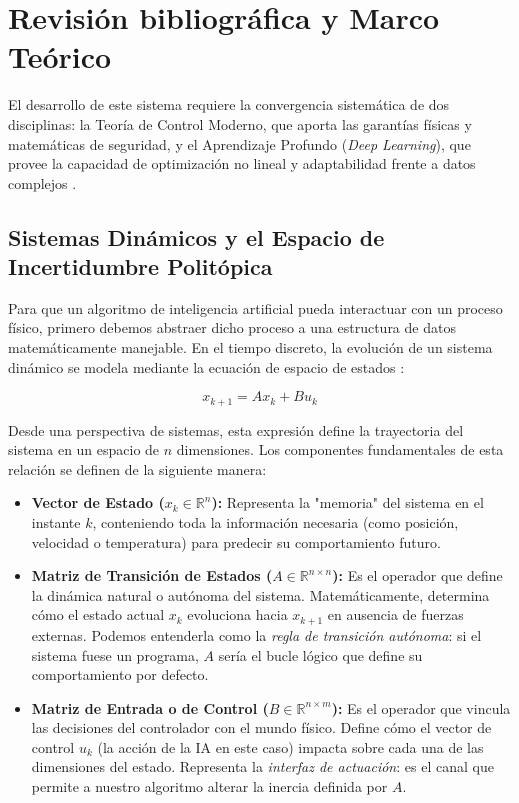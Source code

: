 \documentclass[12pt,twoside]{report}
\begin{document}
\chapter{Revisión bibliográfica y Marco Teórico}
\label{sec:revision}

El desarrollo de este sistema requiere la convergencia sistemática de dos disciplinas: la Teoría de Control Moderno, que aporta las garantías físicas y matemáticas de seguridad, y el Aprendizaje Profundo (\textit{Deep Learning}), que provee la capacidad de optimización no lineal y adaptabilidad frente a datos complejos \cite{zhou1996}. 

\section{Sistemas Dinámicos y el Espacio de Incertidumbre Politópica}

Para que un algoritmo de inteligencia artificial pueda interactuar con un proceso físico, primero debemos abstraer dicho proceso a una estructura de datos matemáticamente manejable. En el tiempo discreto, la evolución de un sistema dinámico se modela mediante la ecuación de espacio de estados \cite{khalil2002}:

\begin{equation}
    x_{k+1} = A x_k + B u_k
    \label{eq:estado_discreto}
\end{equation}

Desde una perspectiva de sistemas, esta expresión define la trayectoria del sistema en un espacio de $n$ dimensiones. Los componentes fundamentales de esta relación se definen de la siguiente manera:

\begin{itemize}
    \item \textbf{Vector de Estado ($x_k \in \mathbb{R}^n$):} Representa la "memoria" del sistema en el instante $k$, conteniendo toda la información necesaria (como posición, velocidad o temperatura) para predecir su comportamiento futuro.
    
    \item \textbf{Matriz de Transición de Estados ($A \in \mathbb{R}^{n \times n}$):} Es el operador que define la dinámica natural o autónoma del sistema. Matemáticamente, determina cómo el estado actual $x_k$ evoluciona hacia $x_{k+1}$ en ausencia de fuerzas externas. Podemos entenderla como la \textit{regla de transición autónoma}: si el sistema fuese un programa, $A$ sería el bucle lógico que define su comportamiento por defecto.
    
    \item \textbf{Matriz de Entrada o de Control ($B \in \mathbb{R}^{n \times m}$):} Es el operador que vincula las decisiones del controlador con el mundo físico. Define cómo el vector de control $u_k$ (la acción de la IA en este caso) impacta sobre cada una de las dimensiones del estado. Representa la \textit{interfaz de actuación}: es el canal que permite a nuestro algoritmo alterar la inercia definida por $A$.
\end{itemize}
\end{document}
